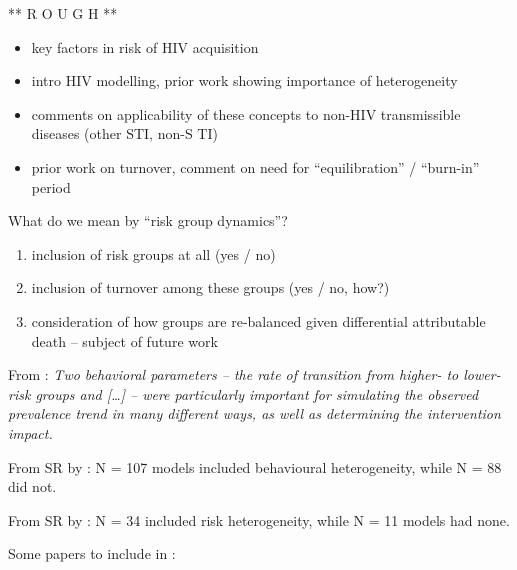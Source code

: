** R O U G H **
\begin{itemize}
  \item key factors in risk of HIV acquisition
  \item intro HIV modelling, prior work showing importance of heterogeneity
  \item comments on applicability of these concepts to non-HIV transmissible diseases
        (other STI, non-S TI)
  \item prior work on turnover, comment on need for ``equilibration'' / ``burn-in'' period
\end{itemize}
What do we mean by ``risk group dynamics''?
\begin{enumerate}
  \item inclusion of risk groups at all (yes / no)
  \item inclusion of turnover among these groups (yes / no, how?)
  \item consideration of how groups are re-balanced given differential attributable death
  -- subject of future work
\end{enumerate}
\par
From \citet{Eaton2014}:
\textit{Two behavioral parameters
-- the rate of transition from higher- to lower-risk groups and \textup{[\dots]} -- 
were particularly important for simulating the observed prevalence trend in many different ways,
as well as determining the intervention impact.}
\par
From SR by \citet{Mishra2012}:
N = 107 models included behavioural heterogeneity, while
N = 88 did not.
\par
From SR by \citet{Ronn2017}:
N = 34 included risk heterogeneity, while
N = 11 models had none.
\par
Some papers to include in :
\cite{Barnighausen2012,
      Cremin2013,
      Eaton2014,
      Estill2012,
      Granich2009,
      Hallett2008,
      Johnson2006,
      Phillips2011,
      Rosenberg2004,
      Shah2016}